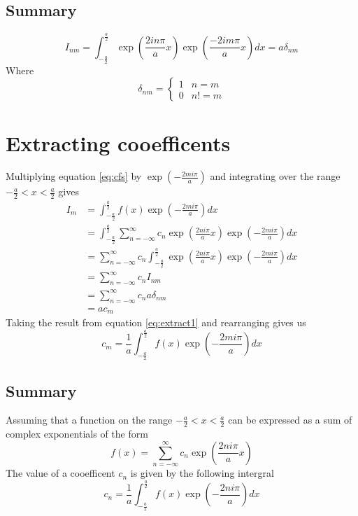 \documentclass[11pt,twoside,a5paper]{book}
\begin{document}
\subsection{Summary}
\begin{mdframed}
\begin{equation*}
I_{nm} = \int_{-\frac{a}{2}}^{\frac{a}{2}} \exp \left( \frac{2 i n \pi}{a} x\right) \exp \left( \frac{-2 i m \pi}{a} x\right) dx = a \delta_{nm}
\end{equation*}
Where
\begin{equation*}
\delta_{nm} = \left\{
  \begin{array}{lr}
    1 & n = m\\
    0 & n != m
  \end{array}
\right.
\end{equation*}
\end{mdframed}
\section{Extracting cooefficents}
Multiplying equation \ref{eq:cfs} by $\exp\left(-\frac{2mi\pi}{a}\right)$ and
integrating over the range $-\frac{a}{2}<x<\frac{a}{2}$ gives
\begin{subequations}
  \label{eq:extract1}
\begin{align}
\label{eq:cfs2}
I_{m}&=\int_{-\frac{a}{2}}^{\frac{a}{2}} f(x) \exp\left(-\frac{2mi\pi}{a}\right) dx \\
&= \int_{-\frac{a}{2}}^{\frac{a}{2}} \sum_{n=-\infty}^{\infty} c_n \exp\left(\frac{2ni\pi}{a}x\right) \exp\left(-\frac{2mi\pi}{a}\right) dx \\
&=\sum_{n=-\infty}^{\infty} c_n \int_{-\frac{a}{2}}^{\frac{a}{2}} \exp\left(\frac{2ni\pi}{a}x\right) \exp\left(-\frac{2mi\pi}{a}\right) dx \\
&=\sum_{n=-\infty}^{\infty} c_n I_{nm} \\
&=\sum_{n=-\infty}^{\infty} c_n a \delta_{nm} \\
&= a c_m
\end{align}
\end{subequations}
Taking the result from equation \ref{eq:extract1} and rearranging gives us
\begin{equation}
c_m = \frac{1}{a}\int_{-\frac{a}{2}}^{\frac{a}{2}} f(x) \exp\left(-\frac{2mi\pi}{a}\right) dx
\end{equation}
\newpage
\subsection{Summary}
\begin{mdframed}
Assuming that a function on the range $-\frac{a}{2}<x<\frac{a}{2}$ can be expressed
as a sum of complex exponentials of the form
\begin{equation*}
f(x)=\sum_{n=-\infty}^{\infty} c_n \exp\left(\frac{2ni\pi}{a}x\right)
\end{equation*}
The value of a cooefficent $c_n$ is given by the following intergral
\begin{equation*}
c_n = \frac{1}{a}\int_{-\frac{a}{2}}^{\frac{a}{2}} f(x) \exp\left(-\frac{2ni\pi}{a}\right) dx
\end{equation*}
\end{mdframed}
\end{document}
